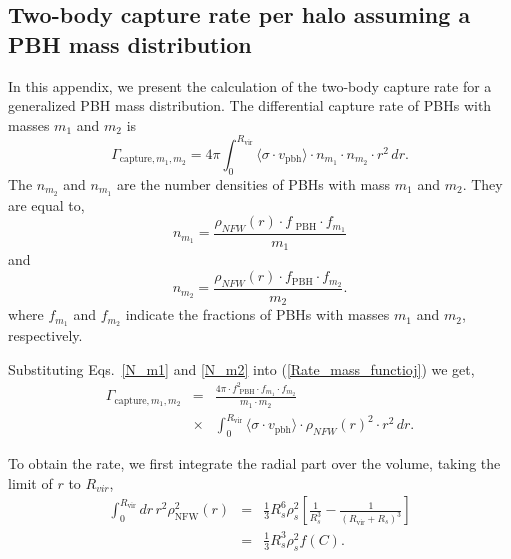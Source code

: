 \documentclass[aps, prd, reprint, nofootinbib]{revtex4-2}
\begin{document}
\begin{appendix}

\section{Two-body capture rate per halo assuming a PBH mass distribution}
\label{App:PBH_mass_distr_2_body}

In this appendix, we present the calculation of the two-body capture rate for a generalized PBH mass distribution. 
The differential capture rate of PBHs with masses $m_1$ and $m_2$ is
\begin{equation}
\label{Rate_mass_functioj}
\Gamma_{\textrm{capture}, m_1, m_2}
 = 4\pi  \int_{0}^{R_{\textrm{vir}}} \langle \sigma \cdot v_{\textrm{pbh}} \rangle \cdot n_{m_{1}}\cdot n_{m_{2}} \cdot r^2 \, dr.
\end{equation}
The $n_{m_2}$ and $n_{m_1}$ are the number densities of PBHs with mass $m_1$ and $m_2$. They are equal to,
\begin{equation}\label{N_m1}
n_{m_1}=\frac{\rho_{NFW}(r) \cdot f_{\textrm{ PBH}} \cdot f_{m_{1}}}{m_1}
\end{equation}
and
\begin{equation}\label{N_m2}
n_{m_2}=\frac{\rho_{NFW}(r) \cdot f_{\textrm{PBH}} \cdot f_{m_{2}}}{m_2}.
\end{equation}
where $f_{m_1}$ and $f_{m_2}$ indicate the fractions of PBHs with masses $m_1$ and $m_2$, respectively.

Substituting Eqs.~\ref{N_m1} and  \ref{N_m2} into (\ref{Rate_mass_functioj}) we get,
\begin{eqnarray}
\Gamma_{\textrm{capture}, m_1, m_2} &=& \frac{4\pi \cdot f_{\textrm{ PBH}}^2 \cdot f_{m_{1}} \cdot f_{m_{2}}}{m_{1} \cdot m_{2}} \\ 
&\times&  \int_{0}^{R_{\textrm{vir}}} \langle \sigma \cdot v_{\textrm{pbh}} \rangle \cdot \rho_{NFW}(r)^2 \cdot r^2 \, dr. \nonumber
\end{eqnarray}

To obtain the rate, we first integrate the radial part over the volume, taking the limit of $r$ to $R_{vir}$,
\begin{eqnarray}
\int_0^{R_{\textrm{vir}}} dr \, r^2 \rho_{\textrm{NFW}}^2(r) &=& \frac{1}{3} R_s^6 \rho_s^2 \left[\frac{1}{R_s^3} - \frac{1}{(R_{\textrm{vir}}+R_s)^3}\right] \nonumber \\
&=& \frac{1}{3} R_s^3 \rho_s^2 f(C).
\label{integral}
\end{eqnarray}


\end{appendix}
\end{document}
